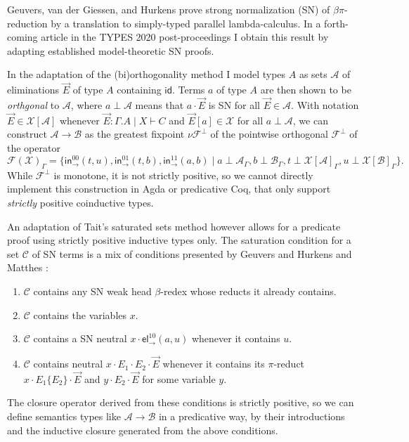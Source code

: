 \documentclass[a4paper]{easychair}
\providecommand{\tightlist}{%
  \setlength{\itemsep}{0pt}\setlength{\parskip}{0pt}}
\newcommand{\tid}{\mathsf{id}}
\newcommand{\tin}{\ensuremath{\mathsf{in}}}
\newcommand{\inn}[2]{\ensuremath{\tin_{#1}^{#2}}}
\newcommand{\tel}{\mathsf{el}}
\newcommand{\el}[2]{\ensuremath{\tel_{#1}^{#2}}}
\newcommand{\A}{\mathcal{A}}
\newcommand{\B}{\mathcal{B}}
\newcommand{\C}{\mathcal{C}}
\newcommand{\F}{\mathcal{F}}
\newcommand{\X}{\mathcal{X}}
\begin{document}
Geuvers, van der Giessen, and Hurkens
\citeyearpar{geuversGiessenHurkens:fundinf19} prove strong normalization (SN)
of $\beta\pi$-reduction by a translation to simply-typed parallel
lambda-calculus.  In a forth-coming article \citep{abel:types20post}
in the TYPES 2020
post-proceedings I obtain this result by adapting established
model-theoretic SN proofs.

In the adaptation of the (bi)orthogonality method I model types $A$ as
sets $\A$ of eliminations $\vec E$ of type $A$ containing $\tid$.
Terms $a$ of type $A$ are then shown to be \emph{orthgonal} to $\A$,
where $a \perp \A$ means that $a \cdot \vec E$ is SN for all $\vec E
\in \A$.  With notation $\vec E \in \X[\A]$ whenever $\vec E : \Gamma.A
\mid X \vdash C$ and $\vec E[a] \in \X$ for all $a \perp \A$, we can
construct $\A \to \B$ as the greatest fixpoint $\nu \F^\perp$ of the
pointwise orthogonal $\F^\perp$ of the operator
\[
  \F(\X)_\Gamma =
  \{
    \inn\to{00}(t,u),
    \inn\to{01}(t,b),
    \inn\to{11}(a,b) \mid
      a \perp \A_\Gamma,
      b \perp \B_\Gamma,
      t \perp \X[\A]_\Gamma,
      u \perp \X[\B]_\Gamma
  \}
  .
\]
While $\F^\perp$ is monotone, it is not strictly positive, so we
cannot directly implement this construction in Agda or predicative
Coq, that only support \emph{strictly} positive coinductive types.

An adaptation of Tait's saturated sets method however allows for a
predicate proof using strictly positive inductive types only.  The
saturation condition for a set $\C$ of SN terms
is a mix of conditions presented by Geuvers and
Hurkens \citeyearpar{geuversHurkens:types17,geuversHurkens:addendumTypes17} and Matthes
\citeyearpar{matthes:classlog}:
\begin{enumerate}
\tightlist
\item $\C$ contains any SN weak head $\beta$-redex whose reducts it
  already contains.
\item $\C$ contains the variables $x$.
\item $\C$ contains a SN neutral $x \cdot \el\to{10}(a,u)$ whenever it
  contains $u$.
\item $\C$ contains neutral $x \cdot E_1 \cdot E_2 \cdot \vec E$
  whenever it contains its $\pi$-reduct $x \cdot E_1\{E_2\} \cdot \vec
  E$ and $y \cdot E_2 \cdot \vec E$ for some variable $y$.
\end{enumerate}
The closure operator derived from these conditions is strictly
positive, so we can define semantics types like $\A \to \B$
in a predicative way, by
their introductions and the inductive closure generated from the
above conditions.
\end{document}
